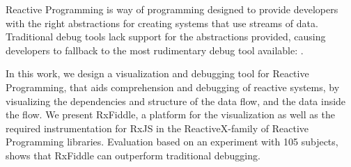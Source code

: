 Reactive Programming is way of programming designed to provide
developers with the right abstractions for creating systems that use
streams of data.  Traditional debug tools lack support for the
abstractions provided, causing developers to fallback to the most
rudimentary debug tool available:  \printfdebugging{}.

In this work, we design a visualization and debugging tool for Reactive
Programming, that aids comprehension and debugging of reactive systems,
by visualizing the dependencies and structure of the data flow, and the
data inside the flow.  We present RxFiddle, a platform for the
visualization as well as the required instrumentation for RxJS in the
ReactiveX-family of Reactive Programming libraries.  Evaluation based on
an experiment with 105 subjects, shows that RxFiddle can outperform
traditional debugging.
